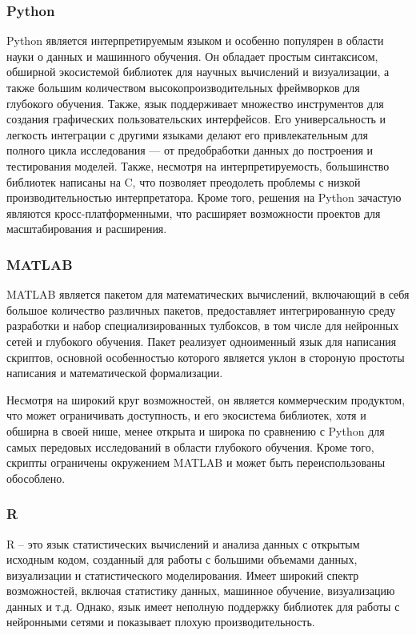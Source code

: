 \subsubsection{Python}
Python является интерпретируемым языком и особенно популярен в области науки о
данных и машинного обучения. Он обладает простым синтаксисом, обширной
экосистемой библиотек для научных вычислений и визуализации, а также большим
количеством высокопроизводительных фреймворков для глубокого обучения. Также,
язык поддерживает множество инструментов для создания графических
пользовательских интерфейсов. Его универсальность и легкость интеграции с
другими языками делают его привлекательным для полного цикла исследования — от
предобработки данных до построения и тестирования моделей. Также, несмотря на
интерпретируемость, большинство библиотек написаны на C, что позволяет
преодолеть проблемы с низкой производительностью интерпретатора. Кроме того,
решения на Python зачастую являются кросс-платформенными, что расширяет
возможности проектов для масштабирования и расширения. 

\subsubsection{MATLAB} 
MATLAB является пакетом для математических вычислений, включающий в себя
большое количество различных пакетов, предоставляет интегрированную среду
разработки и набор специализированных тулбоксов, в том числе для нейронных
сетей и глубокого обучения. Пакет реализует одноименный язык для написания
скриптов, основной особенностью которого является уклон в стороную простоты
написания и математической формализации.

Несмотря на широкий круг возможностей, он является коммерческим продуктом, что
может ограничивать доступность, и его экосистема библиотек, хотя и обширна в
своей нише, менее открыта и широка по сравнению с Python для самых передовых
исследований в области глубокого обучения. Кроме того, скрипты ограничены
окружением MATLAB и может быть переиспользованы обособлено.

\subsubsection{R}

R – это язык статистических вычислений и анализа данных с открытым исходным
кодом, созданный для работы с большими объемами данных, визуализации и
статистического моделирования. Имеет широкий спектр возможностей, включая
статистику данных, машинное обучение, визуализацию данных и т.д. Однако, язык
имеет неполную поддержку библиотек для работы с нейронными сетями и показывает
плохую производительность.

